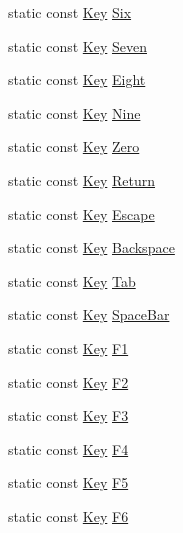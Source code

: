 \begin{DoxyCompactItemize}
static const \hyperlink{classastu_1_1Key}{Key} \hyperlink{classastu_1_1Keys_a492c588d8b31b73a1a6094d878642629}{Six}
\item 
static const \hyperlink{classastu_1_1Key}{Key} \hyperlink{classastu_1_1Keys_a4422275f87e13ce9f7b7e86f9ec2a162}{Seven}
\item 
static const \hyperlink{classastu_1_1Key}{Key} \hyperlink{classastu_1_1Keys_a09c8502bc50ec8b59e026db99b43e088}{Eight}
\item 
static const \hyperlink{classastu_1_1Key}{Key} \hyperlink{classastu_1_1Keys_a50670d54dafbfc2c7802e6761afb2fa3}{Nine}
\item 
static const \hyperlink{classastu_1_1Key}{Key} \hyperlink{classastu_1_1Keys_aa9f390ffc45b3b49db894d46eb187874}{Zero}
\item 
static const \hyperlink{classastu_1_1Key}{Key} \hyperlink{classastu_1_1Keys_af5ea22365e892ab332c647665416e2af}{Return}
\item 
static const \hyperlink{classastu_1_1Key}{Key} \hyperlink{classastu_1_1Keys_afd6f5b6a8e45ec3744ddeaf0fd43b26f}{Escape}
\item 
static const \hyperlink{classastu_1_1Key}{Key} \hyperlink{classastu_1_1Keys_a6eeece1cb8f20622e818e2799667795e}{Backspace}
\item 
static const \hyperlink{classastu_1_1Key}{Key} \hyperlink{classastu_1_1Keys_a58c29521b90b26088dd14c49235843d4}{Tab}
\item 
static const \hyperlink{classastu_1_1Key}{Key} \hyperlink{classastu_1_1Keys_a6e3808ecdf4dd838fef03616dcc5b7b2}{Space\+Bar}
\item 
static const \hyperlink{classastu_1_1Key}{Key} \hyperlink{classastu_1_1Keys_aed61c503136a038db034feab70b3a62b}{F1}
\item 
static const \hyperlink{classastu_1_1Key}{Key} \hyperlink{classastu_1_1Keys_a0f44018420ad4ae807cb8a485b73f15f}{F2}
\item 
static const \hyperlink{classastu_1_1Key}{Key} \hyperlink{classastu_1_1Keys_ab42a221c36f094c553eb87474b96fdd5}{F3}
\item 
static const \hyperlink{classastu_1_1Key}{Key} \hyperlink{classastu_1_1Keys_a633aa7c22f0b255fda07de0c9ad2d9cc}{F4}
\item 
static const \hyperlink{classastu_1_1Key}{Key} \hyperlink{classastu_1_1Keys_a067b8cff591c84124bbbc1322cfdc8dc}{F5}
\item 
static const \hyperlink{classastu_1_1Key}{Key} \hyperlink{classastu_1_1Keys_a0b0e08a8b925946c9b8fb96ef1d68432}{F6}
\item 

\end{DoxyCompactItemize}
